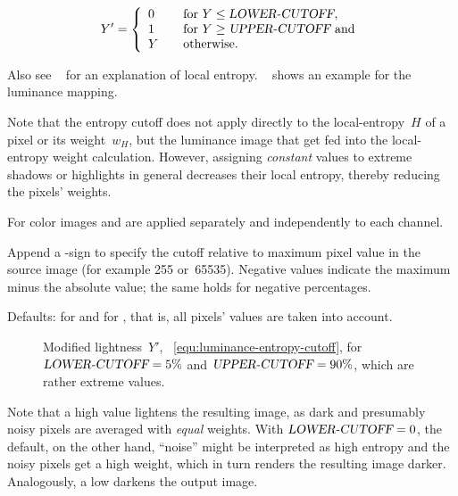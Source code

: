 \begin{codelist}
  \begin{equation}\label{equ:luminance-entropy-cutoff}
  Y' = \left\{
  \begin{array}{ll}
    0 & \quad \mbox{for }Y \le \textsl{LOWER-CUTOFF}, \\
    1 & \quad \mbox{for }Y \ge \textsl{UPPER-CUTOFF}\mbox{ and} \\
    Y & \quad \mbox{otherwise.}
  \end{array}
  \right.
  \end{equation}

  Also see \sectionName~ for an explanation of local
  entropy.  \figureName~ shows an example for the luminance mapping.

  Note that the entropy cutoff does not apply directly to the local-entropy~$H$ of a pixel or
  its weight~$w_H$, but the luminance image that get fed into the local-entropy weight
  calculation.  However, assigning \emph{constant} values to extreme shadows or highlights
  in general decreases their local entropy, thereby reducing the pixels' weights.

  For color images  and  are applied separately and
  independently to each channel.

  Append a \sample{\%}-sign to specify the cutoff relative to maximum pixel value in the source
  image (for example 255 or~65535).  Negative  values indicate the maximum
  minus the absolute  value; the same holds for negative percentages.

  Defaults:  for  and
   for , that is, all pixels' values
  are taken into account.

  \begin{figure}[htbp]
    \begin{maxipage}
      \centering
    \end{maxipage}

    \caption[Entropy cutoff function]{\label{fig:entropy-cutoff}%
      Modified lightness~$Y'$, \equationabbr~\ref{equ:luminance-entropy-cutoff}, for
      $\textsl{LOWER-CUTOFF} = 5\%$ and $\textsl{UPPER-CUTOFF} = 90\%$, which are rather
      extreme values.}
  \end{figure}

  \begin{geeknote}
    Note that a high  value lightens the resulting image, as dark and
    presumably noisy pixels are averaged with \emph{equal} weights.  With
    $\textsl{LOWER-CUTOFF} = 0$, the default, on the other hand, ``noise'' might be interpreted
    as high entropy and the noisy pixels get a high weight, which in turn renders the resulting
    image darker.  Analogously, a low  darkens the output image.
  \end{geeknote}


\end{codelist}
